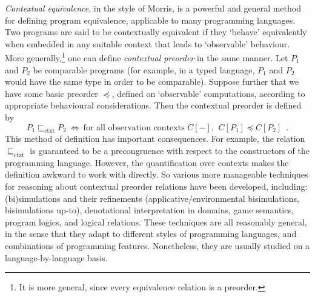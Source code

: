 \documentclass[a4paper,UKenglish]{lipics-v2018}
\newcommand{\Basicleq}{\preccurlyeq}
\theoremstyle{plain}
\begin{document}
\emph{Contextual equivalence}, in the style of Morris,
is a powerful and general method for defining program equivalence, applicable to many 
programming languages. 
Two programs are said to be contextually equivalent if 
they `behave' equivalently when embedded in any suitable context that leads to `observable' behaviour. 
More generally,\footnote{It is more general, since every equivalence relation is a preorder.} one can define \emph{contextual preorder} in the same manner. Let $P_1$ and $P_2$ be comparable programs (for example, in a typed language, $P_1$ and $P_2$ would  have the same type in order to be comparable). Suppose further  that we have some {basic preorder} $\Basicleq$, defined on `observable' computations, according to appropriate behavioural considerations. Then the contextual preorder is defined by
\begin{equation}
\label{equation:contextual-preorder}
P_1 \sqsubseteq_\text{ctxt} P_2 ~ \iff ~
\text{for all observation contexts $C[-]$, $~ C[P_1] \Basicleq C[P_2]$} \enspace . 
\end{equation}
This method of definition has important consequences. For example, the relation
$\sqsubseteq_\text{ctxt}$ is guaranteed to be a precongruence with respect 
to the constructors of the programming language.
However, the quantification over contexts makes the definition awkward to work with directly.
So various more manageable techniques for reasoning about contextual preorder relations have been developed, including:
(bi)simulations 
and their refinements (applicative/environmental bisimulations, 
bisimulations up-to), %
denotational interpretation in domains, %
game semantics, %
program logics,
and logical relations. %
These techniques are all reasonably general, in the sense that they adapt to different styles of programming languages, and combinations of programming features. Nonetheless, they are usually studied on a language-by-language basis.
\end{document}
